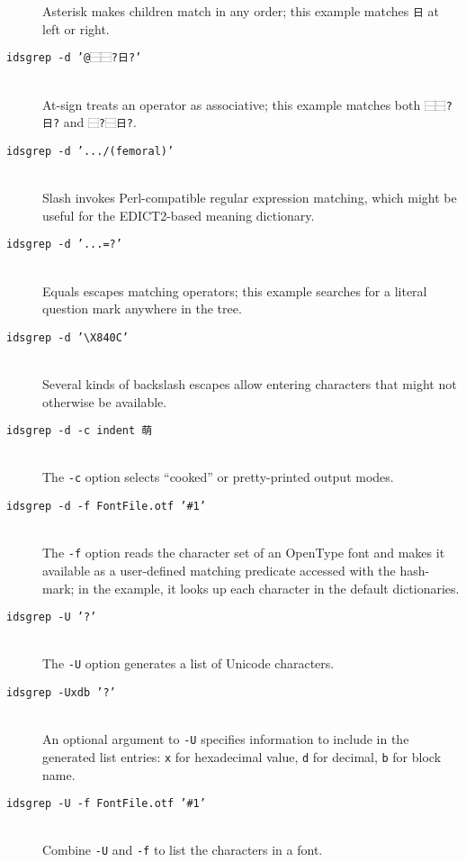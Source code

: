 \documentclass[twocolumn]{report}
\begin{document}
\begin{description}
  Asterisk makes children match in any order; this example matches
  \texttt{日} at left or right.
\item[\texttt{idsgrep -d '@⿱⿱?日?'}]~\\
  At-sign treats an operator as associative; this example matches both
  \texttt{⿱⿱?日?} and \texttt{⿱?⿱日?}.
\item[\texttt{idsgrep -d '.../(femoral)'}]~\\
  Slash invokes Perl-compatible regular expression matching, which might be
  useful for the EDICT2-based meaning dictionary.
\item[\texttt{idsgrep -d '...=?'}]~\\
  Equals escapes matching operators; this example searches for a literal
  question mark anywhere in the tree.
\item[\texttt{idsgrep -d '\textbackslash X840C'}]~\\
  Several kinds of backslash escapes allow entering characters that might
  not otherwise be available.
\item[\texttt{idsgrep -d -c indent 萌}]~\\
  The \texttt{-c} option selects ``cooked'' or pretty-printed output modes.
\item[\texttt{idsgrep -d -f FontFile.otf '\#1'}]~\\
  The \texttt{-f} option reads the character set of an OpenType font
  and makes it available as a user-defined matching predicate accessed
  with the hash-mark; in the example, it looks up each character in the
  default dictionaries.
\item[\texttt{idsgrep -U '?'}]~\\
  The \texttt{-U} option generates a list of Unicode characters.
\item[\texttt{idsgrep -Uxdb '?'}]~\\
  An optional argument to \texttt{-U} specifies information to include
  in the generated list entries: \texttt{x} for hexadecimal
  value, \texttt{d} for decimal, \texttt{b} for block name.
\item[\texttt{idsgrep -U -f FontFile.otf '\#1'}]~\\
  Combine \texttt{-U} and \texttt{-f} to list the characters in a font.
\end{description}

\end{document}

